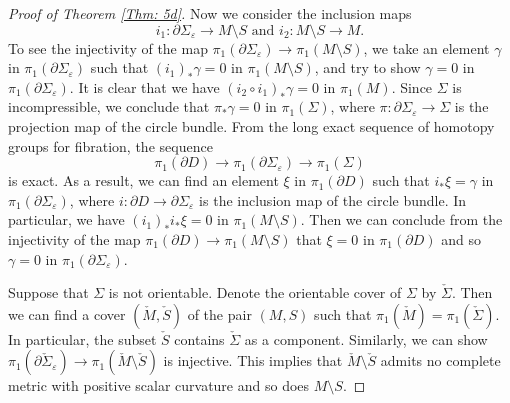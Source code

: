 \documentclass[11pt, reqno]{amsart}
\numberwithin{equation}{section}
\theoremstyle{definition}
\newcommand{\ve}{\varepsilon}
\begin{document}
\begin{proof}[Proof of Theorem \ref{Thm: 5d}]
Now we consider the inclusion maps
$$i_1:\partial\Sigma_\ve\to M\setminus S\mbox{ and }i_2:M\setminus S\to M.$$
To see the injectivity of the map $\pi_1(\partial\Sigma_\ve)\to \pi_1(M\setminus S)$, we take an element $\gamma$ in $\pi_1(\partial\Sigma_\ve)$ such that $(i_1)_*\gamma=0$ in $\pi_1(M\setminus S)$, and try to show $\gamma=0$ in $\pi_1(\partial\Sigma_\ve)$. It is clear that we have $(i_2\circ i_1)_*\gamma=0$ in $\pi_1(M)$. Since $\Sigma$ is incompressible, we conclude that $\pi_*\gamma=0$ in $\pi_1(\Sigma)$, where $\pi:\partial\Sigma_\ve\to \Sigma$ is the projection map of the circle bundle. From the long exact sequence of homotopy groups for fibration, the sequence
$$\pi_1(\partial D)\to\pi_1(\partial\Sigma_\ve)\to \pi_1(\Sigma)$$
is exact. As a result, we can find an element $\xi$ in $\pi_1(\partial D)$ such that $i_*\xi=\gamma$ in $\pi_1(\partial\Sigma_\ve)$, where $i:\partial D\to \partial\Sigma_\ve$ is the inclusion map of the circle bundle. In particular, we have $(i_1)_*i_*\xi =0$ in $\pi_1(M\setminus S)$. Then we can conclude from the injectivity of the map $\pi_1(\partial D)\to\pi_1(M\setminus S)$ that $\xi=0$ in $\pi_1(\partial D)$ and so $\gamma=0$ in $\pi_1(\partial\Sigma_\ve)$.


Suppose that $\Sigma$ is not orientable. Denote the orientable cover of $\Sigma$ by $\check\Sigma$. Then we can find a cover $(\check M,\check S)$ of the pair $(M,S)$ such that $\pi_1(\check M)=\pi_1(\check\Sigma)$. In particular, the subset $\check S$ contains $\check\Sigma$ as a component. Similarly, we can show $\pi_1(\partial \check\Sigma_\ve) \to \pi_1(\check M \setminus \check S)$ is injective. This implies that $\check M\setminus\check S$ admits no complete metric with positive scalar curvature and so does $M\setminus S$.

\end{proof}
\end{document}

